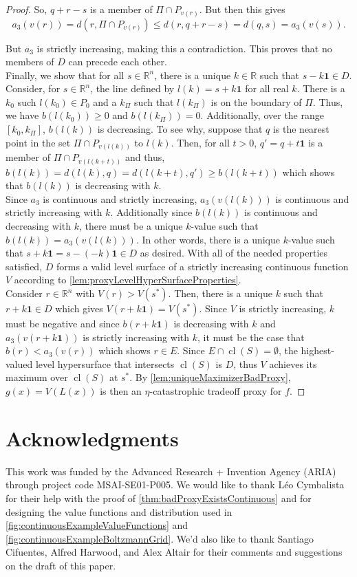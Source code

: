 \documentclass{article}
\DeclareMathOperator*{\cl}{cl}
\begin{document}
\begin{proof}
So, $q + r - s$ is a member of $\Pi \cap P_{v(r)}$. But then this gives
$$a_3(v(r)) = d(r, \Pi \cap P_{v(r)}) \leq d(r, q + r - s) = d(q, s) = a_3(v(s)).$$

But $a_3$ is strictly increasing, making this a contradiction. This proves that no members of $D$ can precede each other.\\

Finally, we show that for all $s \in \mathbb R^n$, there is a unique $k \in \mathbb R$ such that $s - k \bm 1 \in D$. Consider, for $s \in \mathbb R^n$, the line defined by $l(k) = s + k \bm 1$ for all real $k$. There is a $k_0$ such $l(k_0) \in P_0$ and a $k_\Pi$ such that $l(k_\Pi)$ is on the boundary of $\Pi$. Thus, we have $b(l(k_0)) \geq 0$ and $b(l(k_\Pi)) = 0$. Additionally, over the range $[k_0, k_\Pi]$, $b(l(k))$ is decreasing. To see why, suppose that $q$ is the nearest point in the set $\Pi \cap P_{v(l(k))}$ to $l(k)$. Then, for all $t>0$, $q' = q + t\bm 1$ is a member of $\Pi \cap P_{v(l(k+t))}$ and thus, $b(l(k)) = d(l(k), q) = d(l(k+t), q') \geq b(l(k+t))$ which shows that $b(l(k))$ is decreasing with $k$.\\

Since $a_3$ is continuous and strictly increasing, $a_3(v(l(k)))$ is continuous and strictly increasing with $k$. Additionally since $b(l(k))$ is continuous and decreasing with $k$, there must be a unique $k$-value such that $b(l(k)) = a_3(v(l(k)))$. In other words, there is a unique $k$-value such that $s + k \bm 1 = s - (-k) \bm 1 \in D$ as desired. With all of the needed properties satisfied, $D$ forms a valid level surface of a strictly increasing continuous function $V$ according to \cref{lem:proxyLevelHyperSurfaceProperties}.\\

Consider $r \in \mathbb R^n$ with $V(r) > V(s^*)$. Then, there is a unique $k$ such that $r + k \bm 1 \in D$ which gives $V(r + k \bm 1) = V(s^*)$. Since $V$ is strictly increasing, $k$ must be negative and since $b(r+k\bm 1)$ is decreasing with $k$ and $a_3(v(r+k \bm 1))$ is strictly increasing with $k$, it must be the case that $b(r) < a_3(v(r))$ which shows $r \in E$. Since $E \cap \cl(S) = \emptyset$, the highest-valued level hypersurface that intersects $\cl(S)$ is $D$, thus $V$ achieves its maximum over $\cl(S)$ at $s^*$. By \cref{lem:uniqueMaximizerBadProxy}, $g(x) = V(L(x))$ is then an $\eta$-catastrophic tradeoff proxy for $f$.
\end{proof}

\section*{Acknowledgments}
This work was funded by the Advanced Research + Invention Agency (ARIA) through project code MSAI-SE01-P005. We would like to thank Léo Cymbalista for their help with the proof of \cref{thm:badProxyExistsContinuous} and for designing the value functions and distribution used in \cref{fig:continuousExampleValueFunctions} and \cref{fig:continuousExampleBoltzmannGrid}. We'd also like to thank Santiago Cifuentes, Alfred Harwood, and Alex Altair for their comments and suggestions on the draft of this paper.



\end{document}
